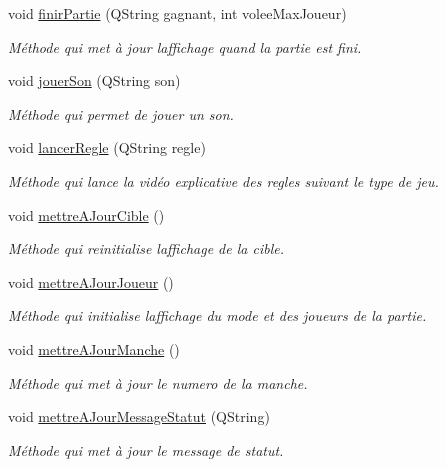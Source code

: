 \begin{DoxyCompactItemize}
void \hyperlink{class_ihm_a0c7ee6ee6313db87c7cc34dbd57dd57d}{finir\+Partie} (Q\+String gagnant, int volee\+Max\+Joueur)
\begin{DoxyCompactList}\small\item\em Méthode qui met à jour l\textquotesingle{}affichage quand la partie est fini. \end{DoxyCompactList}\item 
void \hyperlink{class_ihm_a55f2d106f7af9ed2e84f78822e23bb97}{jouer\+Son} (Q\+String son)
\begin{DoxyCompactList}\small\item\em Méthode qui permet de jouer un son. \end{DoxyCompactList}\item 
void \hyperlink{class_ihm_a5186bc159a8bf1fa359da4f4ccd78f5a}{lancer\+Regle} (Q\+String regle)
\begin{DoxyCompactList}\small\item\em Méthode qui lance la vidéo explicative des regles suivant le type de jeu. \end{DoxyCompactList}\item 
void \hyperlink{class_ihm_a3c504c417aa2d3efd82ac5feded16895}{mettre\+A\+Jour\+Cible} ()
\begin{DoxyCompactList}\small\item\em Méthode qui reinitialise l\textquotesingle{}affichage de la cible. \end{DoxyCompactList}\item 
void \hyperlink{class_ihm_aaeeb08a39f940e58da194768763dc00b}{mettre\+A\+Jour\+Joueur} ()
\begin{DoxyCompactList}\small\item\em Méthode qui initialise l\textquotesingle{}affichage du mode et des joueurs de la partie. \end{DoxyCompactList}\item 
void \hyperlink{class_ihm_a3b41d92919b87966f903b22863dc6acb}{mettre\+A\+Jour\+Manche} ()
\begin{DoxyCompactList}\small\item\em Méthode qui met à jour le numero de la manche. \end{DoxyCompactList}\item 
void \hyperlink{class_ihm_a7837ec36fbac1ca96d049ad27263b951}{mettre\+A\+Jour\+Message\+Statut} (Q\+String)
\begin{DoxyCompactList}\small\item\em Méthode qui met à jour le message de statut. \end{DoxyCompactList}\item 

\end{DoxyCompactItemize}
